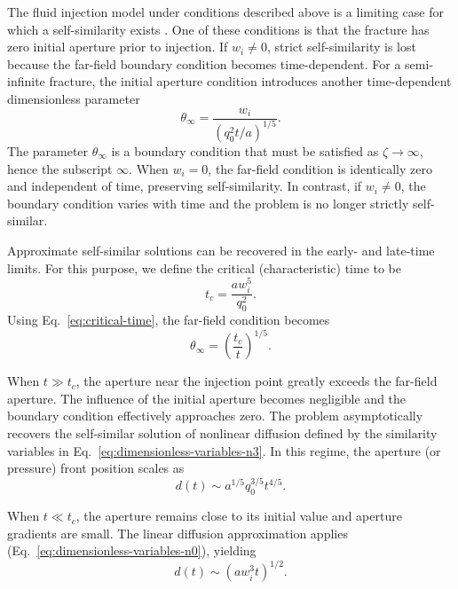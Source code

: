 \documentclass[draft]{agujournal2019}
\begin{document}
The fluid injection model under conditions described above is a limiting case for which a self-similarity exists \cite{Barenblatt1996}. One of these conditions is that the fracture has zero initial aperture prior to injection. If $w_i \neq 0$, strict self-similarity is lost because the far-field boundary condition becomes time-dependent. For a semi-infinite fracture, the initial aperture condition introduces another time-dependent dimensionless parameter
\begin{equation}
	\theta_{\infty} = \frac{w_i}{(q_0^2 t / a)^{1/5}}.
\end{equation}
The parameter $\theta_{\infty}$ is a boundary condition that must be satisfied as $\zeta \to \infty$, hence the subscript $\infty$. When $w_i = 0$, the far-field condition is identically zero and independent of time, preserving self-similarity. In contrast, if $w_i \neq 0$, the boundary condition varies with time and the problem is no longer strictly self-similar.

Approximate self-similar solutions can be recovered in the early- and late-time limits. For this purpose, we define the critical (characteristic) time to be
\begin{equation}
	t_c = \frac{a w_i^5}{q_0^2}.
	\label{eq:critical-time}
\end{equation}
Using Eq.~\ref{eq:critical-time}, the far-field condition becomes
\begin{equation}
	\theta_{\infty} = \left( \frac{t_c}{t} \right)^{1/5}.
	\label{eq:critical-time-boundary-condition}
\end{equation}

When $t \gg t_c$, the aperture near the injection point greatly exceeds the far-field aperture. The influence of the initial aperture becomes negligible and the boundary condition effectively approaches zero. The problem asymptotically recovers the self-similar solution of nonlinear diffusion defined by the similarity variables in Eq.~\ref{eq:dimensionless-variables-n3}. In this regime, the aperture (or pressure) front position scales as
\begin{equation}
	d(t) \sim a^{1/5} q_0^{3/5} t^{4/5}.
	\label{eq:late-time-scaling}
\end{equation}

When $t \ll t_c$, the aperture remains close to its initial value and aperture gradients are small. The linear diffusion approximation applies (Eq.~\ref{eq:dimensionless-variables-n0}), yielding
\begin{equation}
	d(t) \sim (a w_i^3 t)^{1/2}.
	\label{eq:early-time-scaling}
\end{equation}
\end{document}
